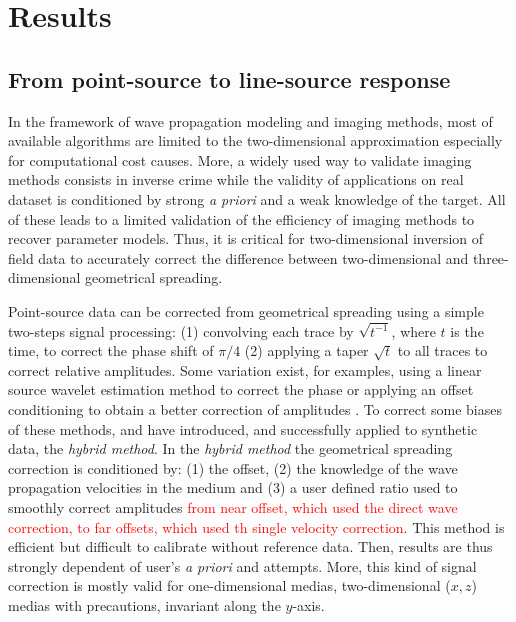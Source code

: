 \documentclass[manuscript,revised]{geophysics}
\newcommand{\twod}{two-dimensional }
\newcommand{\thrd}{three-dimensional }
\begin{document}
\section{Results}

\subsection{From point-source to line-source response}

\noindent In the framework of wave propagation modeling and imaging methods, most of available algorithms are limited to the \twod approximation especially for computational cost causes. More, a widely used way to validate imaging methods consists in inverse crime while the validity of applications on real dataset is conditioned by strong \textit{a priori} and a weak knowledge of the target. All of these leads to a limited validation of the efficiency of imaging methods to recover parameter models. Thus, it is critical for \twod inversion of field data to accurately correct the difference between \twod and \thrd geometrical spreading.

\noindent Point-source data can be corrected from geometrical spreading using a simple two-steps signal processing: (1) convolving each trace by $\sqrt{t^{-1}}$, where $t$ is the time, to correct the phase shift of $\pi/4$ (2) applying a taper $\sqrt{t}$ to all traces to correct relative amplitudes. Some variation exist, for examples, using a linear source wavelet estimation method to correct the phase \citep{Bretaudeau_FWI_2013} or applying an offset conditioning to obtain a better correction of amplitudes \citep{Tran_SWT_2013}. To correct some biases of these methods, \citet{Forbriger_LSS_2014} and \citet{Schafer_LSS_2014} have introduced, and successfully applied to synthetic data, the \textit{hybrid method}. In the \textit{hybrid method} the geometrical spreading correction is conditioned by: (1) the offset, (2) the knowledge of the wave propagation velocities in the medium and (3) a user defined ratio used to smoothly correct amplitudes \textcolor{red}{from near offset, which used the direct wave correction, to far offsets, which used th single velocity correction}. This method is efficient but difficult to calibrate without reference data. Then, results are thus strongly dependent of user's \textit{a priori} and attempts. More, this kind of signal correction is mostly valid for one-dimensional medias, two-dimensional ($x,z$) medias with precautions, invariant along the $y$-axis.    
\end{document}
